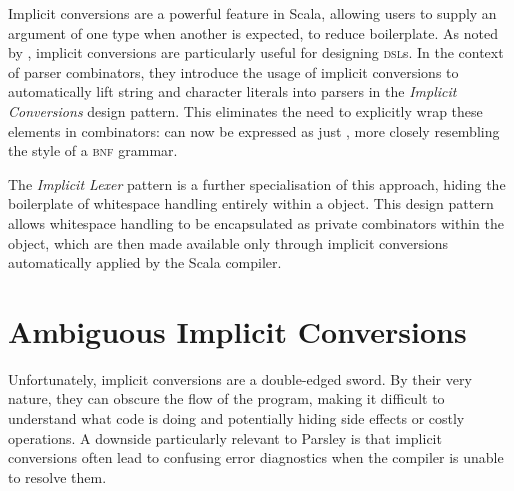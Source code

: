 \documentclass[../../main.tex]{subfiles}
\begin{document}

\label{sec:simple-rules}
Implicit conversions are a powerful feature in Scala, allowing users to supply an argument of one type when another is expected, to reduce boilerplate.
As noted by \textcite{willis_design_2022}, implicit conversions are particularly useful for designing \textsc{dsl}s.
In the context of parser combinators, they introduce the usage of implicit conversions to automatically lift string and character literals into parsers in the \emph{Implicit Conversions} design pattern.
This eliminates the need to explicitly wrap these elements in combinators:
 can now be expressed as just , more closely resembling the style of a \textsc{bnf} grammar.

The \emph{Implicit Lexer} pattern is a further specialisation of this approach, hiding the boilerplate of whitespace handling entirely within a  object.
This design pattern allows whitespace handling to be encapsulated as private combinators within the  object, which are then made available only through implicit conversions automatically applied by the Scala compiler.

\section{Ambiguous Implicit Conversions}
Unfortunately, implicit conversions are a double-edged sword.
By their very nature, they can obscure the flow of the program, making it difficult to understand what code is doing and potentially hiding side effects or costly operations.
A downside particularly relevant to Parsley is that implicit conversions often lead to confusing error diagnostics when the compiler is unable to resolve them.
\end{document}
